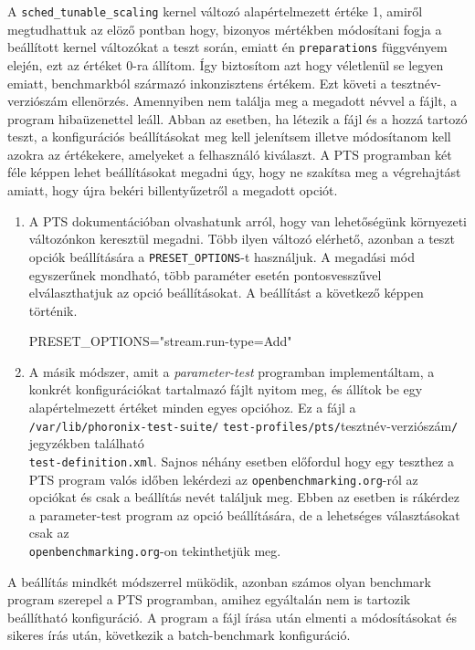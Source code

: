 A \texttt{sched\_tunable\_scaling} kernel változó alapértelmezett értéke 1, amiről megtudhattuk az elöző pontban hogy, bizonyos mértékben módosítani fogja a beállított kernel változókat a teszt során, emiatt én \texttt{preparations} függvényem elején, ezt az értéket 0-ra állítom. Így biztosítom azt hogy véletlenül se legyen emiatt, benchmarkból származó inkonzisztens értékem.
Ezt követi a tesztnév-verziószám ellenörzés. Amennyiben nem találja meg a megadott névvel a fájlt, a program hibaüzenettel leáll.
Abban az esetben, ha létezik a fájl és a hozzá tartozó teszt, a konfigurációs beállításokat meg kell jelenítsem illetve módosítanom kell azokra az értékekere, amelyeket a felhasználó kiválaszt.
A PTS programban két féle képpen lehet beállításokat megadni úgy, hogy ne szakítsa meg a végrehajtást amiatt, hogy újra bekéri billentyűzetről a megadott opciót.
\begin{enumerate}
\item A PTS dokumentációban olvashatunk arról, hogy van lehetőségünk környezeti változónkon keresztül megadni. Több ilyen változó elérhető, azonban a teszt opciók beállítására a \texttt{PRESET\_OPTIONS}-t használjuk. A megadási mód egyszerűnek mondható, több paraméter esetén pontosvesszűvel elválaszthatjuk az opció beállításokat. A beállítást a következő képpen történik.
\begin{cpp}
PRESET\_OPTIONS="stream.run-type=Add"
\end{cpp}
\item A másik módszer, amit a \textit{parameter-test} programban implementáltam, a konkrét konfigurációkat tartalmazó fájlt nyitom meg, és állítok be egy alapértelmezett értéket minden egyes opcióhoz. Ez a fájl a \texttt{/var/lib/phoronix-test-suite/} \texttt{test-profiles/pts/}tesztnév-verziószám\texttt{/} jegyzékben található \\ \texttt{test-definition.xml}. Sajnos néhány esetben előfordul hogy egy teszthez a PTS program valós időben lekérdezi az \texttt{openbenchmarking.org}-ról az opciókat és csak a beállítás nevét találjuk meg. Ebben az esetben is rákérdez a parameter-test program az opció beállítására, de a lehetséges választásokat csak az \\ \texttt{openbenchmarking.org}-on tekinthetjük meg. 
\end{enumerate}
A beállítás mindkét módszerrel müködik, azonban számos olyan benchmark program szerepel a PTS programban, amihez egyáltalán nem is tartozik beállítható konfiguráció. A program a fájl írása után elmenti a módosításokat és sikeres írás után, következik a batch-benchmark konfiguráció. 
